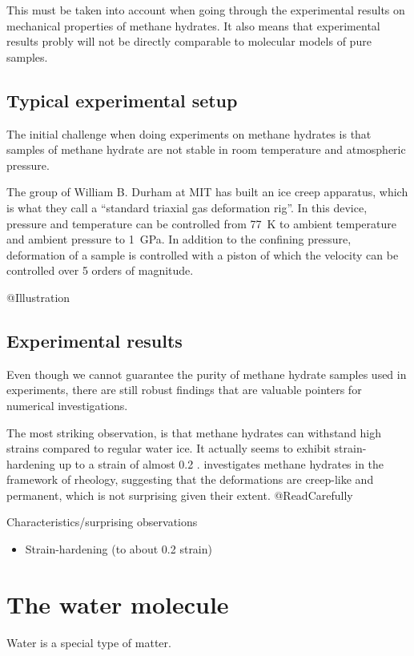 This must be taken into account when going through the experimental results on mechanical properties of methane hydrates. It also means that experimental results probly will not be directly comparable to molecular models of pure samples.

\subsection{Typical experimental setup}
The initial challenge when doing experiments on methane hydrates is that samples of methane hydrate are not stable in room temperature and atmospheric pressure.

The group of William B. Durham at MIT has built an ice creep apparatus, which is what they call a ``standard triaxial gas deformation rig''. In this device, pressure and temperature can be controlled from \SI{77}{\kelvin} to ambient temperature and ambient pressure to \SI{1}{\giga\pascal}. In addition to the confining pressure, deformation of a sample is controlled with a piston of which the velocity can be controlled over 5 orders of magnitude.

@Illustration

\subsection{Experimental results}
Even though we cannot guarantee the purity of methane hydrate samples used in experiments, there are still robust findings that are valuable pointers for numerical investigations. 

The most striking observation, is that methane hydrates can withstand high strains compared to regular water ice. It actually seems to exhibit strain-hardening up to a strain of almost 0.2 \cite{Durham2003, Stern1998}. \cite{Durham2003} investigates methane hydrates in the framework of rheology, suggesting that the deformations are creep-like and permanent, which is not surprising given their extent. @ReadCarefully 

Characteristics/surprising observations
\begin{itemize}
\item Strain-hardening (to about 0.2 strain)
\end{itemize}

\section{The water molecule}
Water is a special type of matter. 

